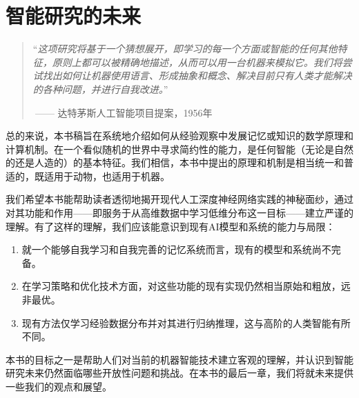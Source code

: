 \documentclass[../../book-main.tex]{subfiles}
\begin{document}
\chapter{智能研究的未来}
\label{ch:future}


  

\begin{quote}
“{\em 这项研究将基于一个猜想展开，即学习的每一个方面或智能的任何其他特征，原则上都可以被精确地描述，从而可以用一台机器来模拟它。我们将尝试找出如何让机器使用语言、形成抽象和概念、解决目前只有人类才能解决的各种问题，并进行自我改进。}”

$~$\hfill —— 达特茅斯人工智能项目提案，1956年
 \end{quote}
\vspace{5mm}


总的来说，本书稿旨在系统地介绍如何从经验观察中发展记忆或知识的数学原理和计算机制。在一个看似随机的世界中寻求简约性的能力，是任何智能（无论是自然的还是人造的）的基本特征。我们相信，本书中提出的原理和机制是相当统一和普适的，既适用于动物，也适用于机器。

我们希望本书能帮助读者透彻地揭开现代人工深度神经网络实践的神秘面纱，通过对其功能和作用——即服务于从高维数据中学习低维分布这一目标——建立严谨的理解。有了这样的理解，我们应该能意识到现有AI模型和系统的能力与局限：
\begin{enumerate}
    \item 就一个能够自我学习和自我完善的记忆系统而言，现有的模型和系统尚不完备。
    \item 在学习策略和优化技术方面，对这些功能的现有实现仍然相当原始和粗放，远非最优。
    \item 现有方法仅学习经验数据分布并对其进行归纳推理，这与高阶的人类智能有所不同。
\end{enumerate} 

本书的目标之一是帮助人们对当前的机器智能技术建立客观的理解，并认识到智能研究未来仍然面临哪些开放性问题和挑战。在本书的最后一章，我们将就未来提供一些我们的观点和展望。
\end{document}

